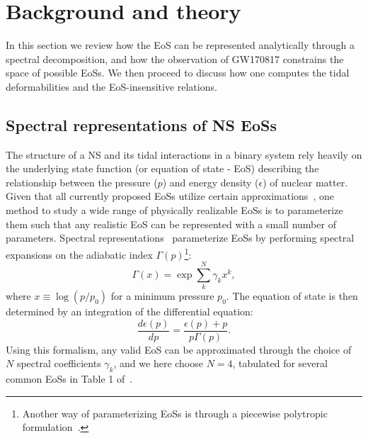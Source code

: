 \documentclass[prd,twocolumn,nofootinbib,superscriptaddress,amsmath,amssymb]{revtex4-1}
\begin{document}

\section{Background and theory}\label{sec:theory}

In this section we review how the EoS can be represented analytically
through a spectral decomposition, and how the observation of GW170817
constrains the space of possible EoSs. We then proceed to discuss 
how one computes the tidal deformabilities and the EoS-insensitive relations. 

\subsection{Spectral representations of NS EoSs}
\label{sec:eos}

The structure of a NS and its tidal interactions in a binary system rely heavily on the underlying state function (or equation of state - EoS) describing the relationship between the pressure ($p$) and energy density ($\epsilon$) of nuclear matter.
Given that all currently proposed EoSs utilize certain approximations~\cite{Oertel:Review,Baym:Review}, one method to study a wide range of physically realizable EoSs is to parameterize them such that any realistic EoS can be represented with a small number of parameters.
Spectral representations~\cite{Lindblom:2010bb,Lindblom:2012zi,Lindblom:2013kra,Lindblom:2018rfr,Abbott:2018exr} parameterize EoSs by performing spectral expansions on the adiabatic index $\Gamma(p)$\footnote{Another way of parameterizing EoSs is through a piecewise polytropic formulation~\cite{Read2009,Lackey:2014fwa,Carney:2018sdv}.}:
\begin{equation}
\Gamma(x) = \exp{\sum_k^{N}\gamma_k x^k},
\end{equation}
where $x \equiv \log{(p/p_0)}$ for a minimum pressure $p_0$.
The equation of state is then determined by an integration of the differential equation:
\begin{equation}
\frac{d \epsilon(p)}{dp}=\frac{\epsilon(p)+p}{p \Gamma(p)}.
\end{equation}
Using this formalism, any valid EoS can be approximated through the choice of $N$ spectral coefficients $\gamma_k$, and we here choose $N=4$, tabulated for several common EoSs in Table 1 of~\cite{Lindblom:2018rfr}.
\end{document}
